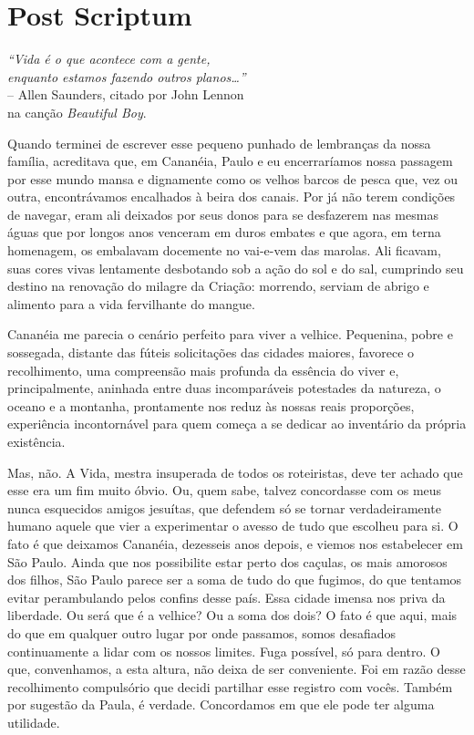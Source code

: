 \chapter*{Post Scriptum}

\begin{flushright}
\small
\textit{``Vida é o que acontece com a gente, \\
enquanto estamos fazendo outros planos\dots''}
\\
-- Allen Saunders, citado por John Lennon\\        
na canção \textit{Beautiful Boy}.
\end{flushright}

Quando terminei de escrever esse pequeno punhado de lembranças da nossa família, acreditava que, em Cananéia, Paulo e eu encerraríamos nossa passagem por esse mundo mansa e dignamente como os velhos barcos de pesca que, vez ou outra, encontrávamos encalhados à beira dos canais.
Por já não terem condições de navegar, eram ali deixados por seus donos para se desfazerem nas mesmas águas que por longos anos venceram em duros embates e que agora, em terna homenagem, os embalavam docemente no vai-e-vem das marolas.
Ali ficavam, suas cores vivas lentamente desbotando sob a ação do sol e do sal, cumprindo seu destino na renovação do milagre da Criação: morrendo, serviam de abrigo e alimento para a vida fervilhante do mangue.

Cananéia me parecia o cenário perfeito para viver a velhice.
Pequenina, pobre e sossegada, distante das fúteis solicitações das cidades maiores, favorece o recolhimento, uma compreensão mais profunda da essência do viver e, principalmente, aninhada entre duas incomparáveis potestades da natureza, o oceano e a montanha, prontamente nos reduz às nossas reais proporções, experiência incontornável para quem começa a se dedicar ao inventário da própria existência.

Mas, não.
A Vida, mestra insuperada de todos os roteiristas, deve ter achado que esse era um fim muito óbvio.
Ou, quem sabe, talvez concordasse com os meus nunca esquecidos amigos jesuítas, que defendem só se tornar verdadeiramente humano aquele que vier a experimentar o avesso de tudo que escolheu para si.
O fato é que deixamos Cananéia, dezesseis anos depois, e viemos nos estabelecer em São Paulo.
Ainda que nos possibilite estar perto dos caçulas, os mais amorosos dos filhos, São Paulo parece ser a soma de tudo do que fugimos, do que tentamos evitar perambulando pelos confins desse país.
Essa cidade imensa nos priva da liberdade.
Ou será que é a velhice? Ou a soma dos dois? O fato é que aqui, mais do que em qualquer outro lugar por onde passamos, somos desafiados continuamente a lidar com os nossos limites.
Fuga possível, só para dentro.
O que, convenhamos, a esta altura, não deixa de ser conveniente.
Foi em razão desse recolhimento compulsório que decidi partilhar esse registro com vocês.
Também por sugestão da Paula, é verdade.
Concordamos em que ele pode ter alguma utilidade.


